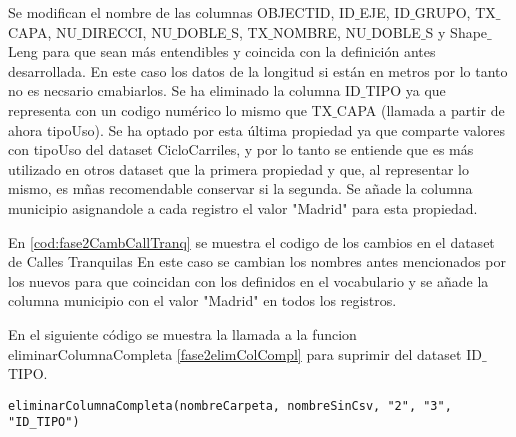 \begin{itemize}
\begin{itemize}
Se modifican el nombre de las columnas OBJECTID, ID$\_$EJE, ID$\_$GRUPO, TX$\_$CAPA, NU$\_$DIRECCI, NU$\_$DOBLE$\_$S, TX$\_$NOMBRE, NU$\_$DOBLE$\_$S y Shape$\_$Leng para que sean más entendibles y coincida con la definición antes desarrollada.
    \newline
En este caso los datos de la longitud si están en metros por lo tanto no es necsario cmabiarlos.
    \newline
Se ha eliminado la columna ID$\_$TIPO ya que representa con un codigo numérico lo mismo que TX$\_$CAPA (llamada a partir de ahora tipoUso). Se ha optado por esta última propiedad ya que comparte valores con tipoUso del dataset CicloCarriles, y por lo tanto se entiende que es más utilizado en otros dataset que la primera propiedad y que, al representar lo mismo, es mñas recomendable conservar si la segunda.
\newline
Se añade la columna municipio asignandole a cada registro el valor "Madrid" para esta propiedad.
	\newline
	
	
	
	    

	    
En \ref{cod:fase2CambCallTranq} se muestra el codigo de los cambios en el dataset de Calles Tranquilas
\newline
En este caso se cambian los nombres antes mencionados por los nuevos para que coincidan con los definidos en el vocabulario y se añade la columna municipio con el valor "Madrid" en todos los registros.
\newline

En el siguiente código se muestra la llamada a la funcion eliminarColumnaCompleta \ref{fase2elimColCompl} para suprimir del dataset ID$\_$TIPO.

\begin{lstlisting}[style=Python, caption=Llamadas a eliminarColumnaCompleta]
eliminarColumnaCompleta(nombreCarpeta, nombreSinCsv, "2", "3", "ID_TIPO")
\end{lstlisting}


\end{itemize}



\end{itemize}